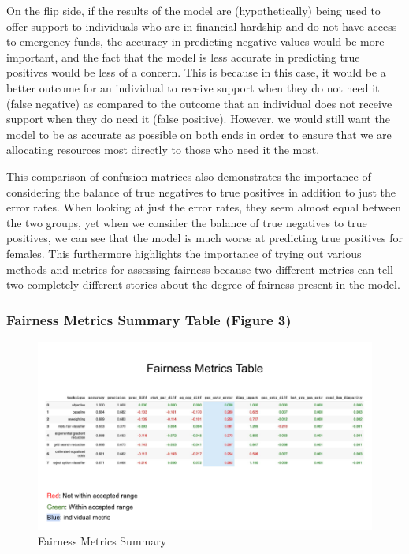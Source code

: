 \documentclass[water,article,submit,moreauthors,pdftex]{mdpi}
\begin{document}
On the flip side, if the results of the model are (hypothetically) being
used to offer support to individuals who are in financial hardship and
do not have access to emergency funds, the accuracy in predicting
negative values would be more important, and the fact that the model is
less accurate in predicting true positives would be less of a concern.
This is because in this case, it would be a better outcome for an
individual to receive support when they do not need it (false negative)
as compared to the outcome that an individual does not receive support
when they do need it (false positive). However, we would still want the
model to be as accurate as possible on both ends in order to ensure that
we are allocating resources most directly to those who need it the most.

This comparison of confusion matrices also demonstrates the importance
of considering the balance of true negatives to true positives in
addition to just the error rates. When looking at just the error rates,
they seem almost equal between the two groups, yet when we consider the
balance of true negatives to true positives, we can see that the model
is much worse at predicting true positives for females. This furthermore
highlights the importance of trying out various methods and metrics for
assessing fairness because two different metrics can tell two completely
different stories about the degree of fairness present in the model.

\hypertarget{fairness-metrics-summary-table-figure-3}{%
\subsubsection{Fairness Metrics Summary Table (Figure
3)}\label{fairness-metrics-summary-table-figure-3}}

\begin{figure}
\centering
\includegraphics[width=\textwidth,height=0.4\textheight]{images/FairnessMetricsSummary.png}
\caption{Fairness Metrics Summary}
\end{figure}
\end{document}
